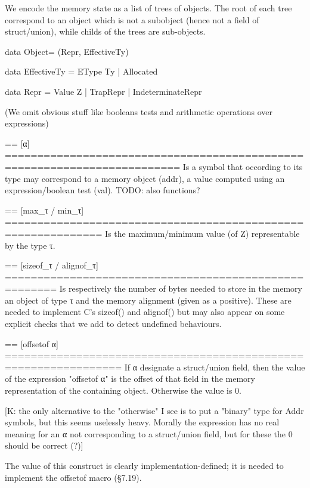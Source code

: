 \documentclass[12pt, a4paper]{article}
\begin{document}
We encode the memory state as a list of trees of objects. The root of
each tree correspond to an object which is not a subobject (hence not
a field of struct/union), while childs of the trees are sub-objects.



data Object= (Repr, EffectiveTy)

data EffectiveTy = EType Ty | Allocated

data Repr = Value Z | TrapRepr | IndeterminateRepr





\newpage












(We omit obvious stuff like booleans tests and arithmetic operations over
 expressions)

== [α] =========================================================================
Is a symbol that occording to its type may correspond to a memory object (addr),
a value computed using an expression/boolean test (val).
TODO: also functions?

== [max\_τ / min\_τ] =============================================================
Is the maximum/minimum value (of Z) representable by the type τ.

== [sizeof\_τ / alignof\_τ] ======================================================
Is respectively the number of bytes needed to store in the memory an object of
type τ and the memory alignment (given as a positive). These are needed to
implement C's sizeof() and alignof() but may also appear on some explicit checks
that we add to detect undefined behaviours.

== [offsetof α] ================================================================
If α designate a struct/union field, then the value of the expression "offsetof
α" is the offset of that field in the memory representation of the containing
object. Otherwise the value is 0.

[K: the only alternative to the "otherwise" I see is to put a "binary" type for
    Addr symbols, but this seems uselessly heavy. Morally the expression has no
    real meaning for an α not corresponding to a struct/union field, but for
    these the 0 should be correct (?)]

The value of this construct is clearly implementation-defined; it is needed to
implement the offsetof macro (§7.19).
\end{document}
